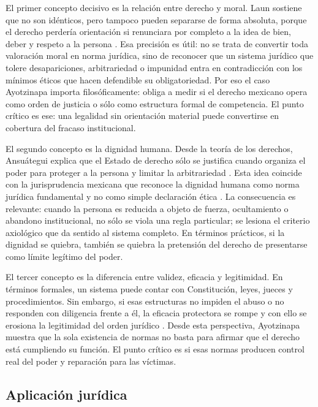 \documentclass[
	spanish,
	letterpaper, oneside
]{article}
\begin{document}
El primer concepto decisivo es la relación entre derecho y moral. Laun sostiene que no son idénticos, pero tampoco pueden separarse de forma absoluta, porque el derecho perdería orientación si renunciara por completo a la idea de bien, deber y respeto a la persona \citep{launDerechoMoral2021}. Esa precisión es útil: no se trata de convertir toda valoración moral en norma jurídica, sino de reconocer que un sistema jurídico que tolere desapariciones, arbitrariedad o impunidad entra en contradicción con los mínimos éticos que hacen defendible su obligatoriedad. Por eso el caso Ayotzinapa importa filosóficamente: obliga a medir si el derecho mexicano opera como orden de justicia o sólo como estructura formal de competencia. El punto crítico es ese: una legalidad sin orientación material puede convertirse en cobertura del fracaso institucional.

El segundo concepto es la dignidad humana. Desde la teoría de los derechos, Ansuátegui explica que el Estado de derecho sólo se justifica cuando organiza el poder para proteger a la persona y limitar la arbitrariedad \citep{ansuategui2007}. Esta idea coincide con la jurisprudencia mexicana que reconoce la dignidad humana como norma jurídica fundamental y no como simple declaración ética \citep{scjnJur37_2016}. La consecuencia es relevante: cuando la persona es reducida a objeto de fuerza, ocultamiento o abandono institucional, no sólo se viola una regla particular; se lesiona el criterio axiológico que da sentido al sistema completo. En términos prácticos, si la dignidad se quiebra, también se quiebra la pretensión del derecho de presentarse como límite legítimo del poder.

El tercer concepto es la diferencia entre validez, eficacia y legitimidad. En términos formales, un sistema puede contar con Constitución, leyes, jueces y procedimientos. Sin embargo, si esas estructuras no impiden el abuso o no responden con diligencia frente a él, la eficacia protectora se rompe y con ello se erosiona la legitimidad del orden jurídico \citep{kelsen1982,ansuategui2007}. Desde esta perspectiva, Ayotzinapa muestra que la sola existencia de normas no basta para afirmar que el derecho está cumpliendo su función. El punto crítico es si esas normas producen control real del poder y reparación para las víctimas.

\subsection{Aplicación jurídica}
\end{document}
